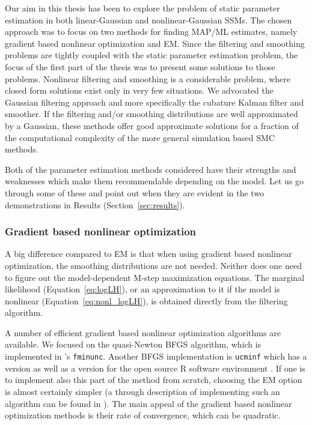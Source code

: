 Our aim in this thesis has been to explore the problem of static parameter estimation
in both linear-Gaussian and nonlinear-Gaussian SSMs. The chosen approach was to focus
on two methods for finding MAP/ML estimates, namely gradient based nonlinear optimization
and EM. Since the filtering and smoothing problems are tightly coupled with the static
parameter estimation problem, the focus of the first part of the thesis was to
present some solutions to those problems. Nonlinear filtering and smoothing is
a considerable problem, where closed form solutions exist only in very few situations.
We advocated the Gaussian filtering approach and more specifically the cubature Kalman
filter and smoother. If the filtering and/or smoothing distributions are well approximated
by a Gaussian, these methods offer good approximate solutions for a fraction of
the computational complexity of the more general simulation based SMC methods.
 
Both of the parameter estimation methods considered have their strengths and weaknesses
which make them recommendable depending on the model. Let us go through
some of these and point out when they are evident in the two demonstrations in
Results (Section~\ref{sec:results}).

\subsubsection*{Gradient based nonlinear optimization}

A big difference compared to EM is that when using
gradient based nonlinear optimization, the smoothing distributions
are not needed. Neither does one need to figure out the model-dependent
M-step maximization equations. The marginal likelihood (Equation~\eqref{eq:logLH}), 
or an approximation to it if the model is nonlinear (Equation~\eqref{eq:nonl_logLH}), 
is obtained directly from the filtering algorithm.

A number of efficient gradient based nonlinear optimization
algorithms are available. We focused on the quasi-Newton BFGS algorithm,
which is implemented in \matlab's \texttt{fminunc}. Another BFGS implementation
is \texttt{ucminf} which has a \matlab{} version as well as a version for the open source
R software environment \parencite{Nielsen2000,rucminf2012,r2012}. If one is to
implement also this part of the method from scratch, choosing the EM option is
almost certainly simpler (a through description of implementing such an algorithm
can be found in ). The main appeal of the gradient based
nonlinear optimization methods is their rate of convergence, which can
be quadratic.  

